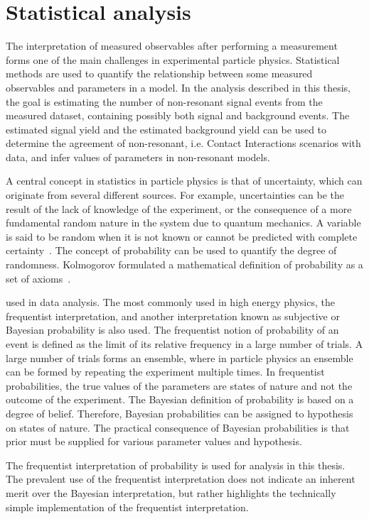 \chapter{Statistical analysis}\label{chap:stats}

The interpretation of measured observables after performing a measurement forms one of the main challenges in experimental particle physics. Statistical methods are used to quantify the relationship between some measured observables and parameters in a model. In the analysis described in this thesis, the goal is estimating the number of non-resonant signal events from the measured dataset, containing possibly both signal and background events. The estimated signal yield and the estimated background yield can be used to determine the agreement of non-resonant, i.e. Contact Interactions scenarios with data, and infer values of parameters in non-resonant models. 

A central concept in statistics in particle physics is that of uncertainty, which can originate from several different sources. For example, uncertainties can be the result of the lack of knowledge of the experiment, or the consequence of a more fundamental random nature in the system due to quantum mechanics. A variable is said to be random when it is not known or cannot be predicted with complete certainty~\cite{Cowan1998}. The concept of probability can be used to quantify the degree of randomness. Kolmogorov formulated a mathematical definition of probability as a set of axioms~\cite{Kol33}. 

used in data analysis. The most commonly used in high energy physics, the frequentist interpretation, and another interpretation known as subjective or Bayesian probability is also used. The frequentist notion of probability of an event is defined as the limit of its relative frequency in a large number of trials. A large number of trials forms an ensemble, where in particle physics an ensemble can be formed by repeating the experiment multiple times. In frequentist probabilities, the true values of the parameters are states of nature and not the outcome of the experiment. The Bayesian definition of probability is based on a degree of belief. Therefore, Bayesian probabilities can be assigned to hypothesis on states of nature. The practical consequence of Bayesian probabilities is that prior must be supplied for various parameter values and hypothesis. 

The frequentist interpretation of probability is used for analysis in this thesis. The prevalent use of the frequentist interpretation does not indicate an inherent merit over the Bayesian interpretation, but rather highlights the technically simple implementation of the frequentist interpretation. 

